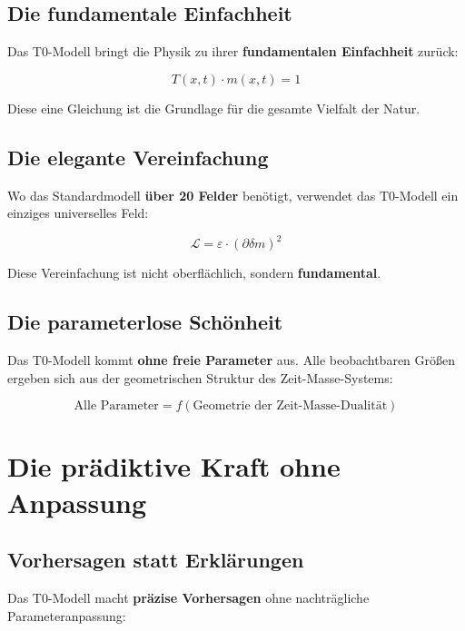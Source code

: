 \documentclass[12pt,a4paper]{report}
\begin{document}
	\subsection{Die fundamentale Einfachheit}
	
	Das T0-Modell bringt die Physik zu ihrer \textbf{fundamentalen Einfachheit} zurück:
	
	\begin{equation}
		T(x,t) \cdot m(x,t) = 1
	\end{equation}
	
	Diese eine Gleichung ist die Grundlage für die gesamte Vielfalt der Natur.
	
	\subsection{Die elegante Vereinfachung}
	
	Wo das Standardmodell \textbf{über 20 Felder} benötigt, verwendet das T0-Modell ein einziges universelles Feld:
	
	\begin{equation}
		\mathcal{L} = \varepsilon \cdot (\partial\delta m)^2
	\end{equation}
	
	Diese Vereinfachung ist nicht oberflächlich, sondern \textbf{fundamental}.
	
	\subsection{Die parameterlose Schönheit}
	
	Das T0-Modell kommt \textbf{ohne freie Parameter} aus. Alle beobachtbaren Größen ergeben sich aus der geometrischen Struktur des Zeit-Masse-Systems:
	
	\begin{equation}
		\text{Alle Parameter} = f(\text{Geometrie der Zeit-Masse-Dualität})
	\end{equation}
	
	\section{Die prädiktive Kraft ohne Anpassung}
	
	\subsection{Vorhersagen statt Erklärungen}
	
	Das T0-Modell macht \textbf{präzise Vorhersagen} ohne nachträgliche Parameteranpassung:
	
\end{document}
